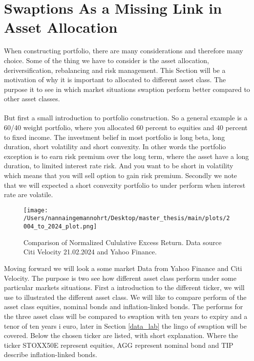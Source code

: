 \section{Swaptions As a Missing Link in Asset Allocation}
When constructing portfolio, there are many considerations and therefore many choice. 
Some of the thing we have to consider is the asset allocation, deriversification, rebalancing 
and risk management. This Section will be a motivation of why it is important to 
allocated to different asset class. The purpose it to see in which market situations
swaption perform better compared to other asset classes.
\\\\
But first a small introduction to portfolio construction. 
So a general  example is a 60/40 weight portfolio, where you allocated 60 percent to equities 
and 40 percent to fixed income. 
The investment belief in most portfolio is long beta, long duration, short volatility and short 
convexity. In other words the portfolio exception is to earn risk premium over the long term, 
where the asset have a long duration, to limited interest rate risk. And you want to be short in
volatility which means that you will sell option to gain risk premium. Secondly we note that we will expected 
a short convexity portfolio to under perform when interest rate are volatile. 
\begin{figure}[H]
    \centering
    \texttt{[image: /Users/nannaingemannohrt/Desktop/master\_thesis/main/plots/2004\_to\_2024\_plot.png]}
    \caption{Comparison of Normalized Cululative Excess Return. Data source Citi Velocity 21.02.2024 
    and Yahoo Finance.}
    \label{fig:2004_2024}
\end{figure}
\noindent
Moving forward we will look a some market Data from Yahoo Finance and Citi Velocity. 
The purpose is two see how different asset class perform under some particular markets situations.
First a introduction to the different ticker, we will use to illustrated the different asset class. 
We will like to compare perform of the asset class equities, nominal bonds and inflation-linked bonds. 
The performs for the three asset class will be compared to swaption with ten years to expiry and a tenor
of ten years i euro, later in Section \ref{data_lab} the lingo of swaption will be covered. 
Below the chosen ticker are listed, with short explanation. Where the ticker STOXX50E represent equities, 
AGG represent nominal bond and TIP describe inflation-linked bonds.

